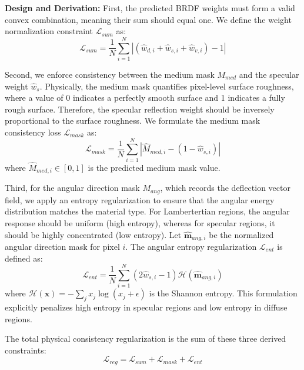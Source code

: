 \documentclass[lettersize,journal]{IEEEtran}
\begin{document}
\textbf{Design and Derivation:}
First, the predicted BRDF weights must form a valid convex combination, meaning their sum should equal one. We define the weight normalization constraint $\mathcal{L}_{sum}$ as:
\begin{equation}
\label{eq:eq22}
\mathcal{L}_{sum} = \frac{1}{N} \sum_{i=1}^{N} \left| \left( \hat{w}_{d,i} + \hat{w}_{s,i} + \hat{w}_{v,i} \right) - 1 \right|
\end{equation}

Second, we enforce consistency between the medium mask $M_{med}$ and the specular weight $\hat{w}_s$. Physically, the medium mask quantifies pixel-level surface roughness, where a value of 0 indicates a perfectly smooth surface and 1 indicates a fully rough surface. Therefore, the specular reflection weight should be inversely proportional to the surface roughness. We formulate the medium mask consistency loss $\mathcal{L}_{mask}$ as:
\begin{equation}
\label{eq:eq23}
\mathcal{L}_{mask} = \frac{1}{N} \sum_{i=1}^{N} \left| \hat{M}_{med, i} - (1 - \hat{w}_{s,i}) \right|
\end{equation}
where $\hat{M}_{med, i} \in [0, 1]$ is the predicted medium mask value.

Third, for the angular direction mask $M_{ang}$, which records the deflection vector field, we apply an entropy regularization to ensure that the angular energy distribution matches the material type. For Lambertertian regions, the angular response should be uniform (high entropy), whereas for specular regions, it should be highly concentrated (low entropy). Let $\hat{\mathbf{m}}_{ang, i}$ be the normalized angular direction mask for pixel $i$. The angular entropy regularization $\mathcal{L}_{ent}$ is defined as:
\begin{equation}
\label{eq:eq24}
\mathcal{L}_{ent} = \frac{1}{N} \sum_{i=1}^{N} (2\hat{w}_{s,i} - 1) \mathcal{H}(\hat{\mathbf{m}}_{ang, i})
\end{equation}
where $\mathcal{H}(\mathbf{x}) = -\sum_j x_j \log(x_j + \epsilon)$ is the Shannon entropy. This formulation explicitly penalizes high entropy in specular regions and low entropy in diffuse regions.

The total physical consistency regularization is the sum of these three derived constraints:
\begin{equation}
\label{eq:eq25}
\mathcal{L}_{reg} = \mathcal{L}_{sum} + \mathcal{L}_{mask} + \mathcal{L}_{ent}
\end{equation}
\end{document}
